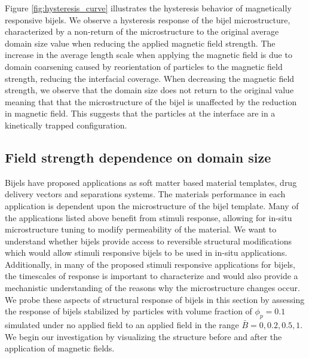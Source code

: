 Figure \ref{fig:hysteresis_curve} illustrates the hysteresis behavior of magnetically responsive bijels. We observe a hysteresis response of the 
bijel microstructure, characterized by a non-return of the microstructure to the original average domain size value when reducing the applied 
magnetic field strength. The increase in the average length scale when applying the magnetic field is due to domain coarsening caused by 
reorientation of particles to the magnetic field strength, reducing the interfacial coverage. When decreasing the magnetic field strength, 
we observe that the domain size does not return to the original value meaning that that the microstructure of the bijel is unaffected by 
the reduction in magnetic field. This suggests that the particles at the interface are in a kinetically trapped configuration.

\subsection{Field strength dependence on domain
size}\label{section:field-strength-dependence-on-domain-size}

Bijels have proposed applications as soft matter based material
templates, drug delivery vectors and separations systems. The materials
performance in each application is dependent upon the microstructure of
the bijel template. Many of the applications listed above benefit from
stimuli response, allowing for in-situ microstructure tuning to modify
permeability of the material. We want to understand whether bijels
provide access to reversible structural modifications which would allow
stimuli responsive bijels to be used in in-situ applications.
Additionally, in many of the proposed stimuli responsive applications
for bijels, the timescales of response is important to characterize and
would also provide a mechanistic understanding of the reasons why the
microstructure changes occur. We probe these aspects of structural
response of bijels in this section by assessing the response of bijels
stabilized by particles with volume fraction of \(\phi_p = 0.1\)
simulated under no applied field to an applied field in the range
\(\bar{B} = 0, 0.2, 0.5, 1\). We begin our investigation by visualizing
the structure before and after the application of magnetic fields.

